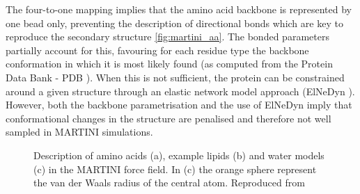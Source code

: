 The four-to-one mapping implies that the amino acid backbone is represented by one bead only, preventing the description of directional bonds which are key to reproduce the secondary structure \ref{fig:martini_aa}. The bonded parameters partially account for this, favouring for each residue type the backbone conformation in which it is most likely found (as computed from the Protein Data Bank - PDB \cite{PDB}). When this is not sufficient, the protein can be constrained around a given structure through an elastic network model approach (ElNeDyn \cite{Periole2009}). However, both the backbone parametrisation and the use of ElNeDyn imply that conformational changes in the structure are penalised and therefore not well sampled in MARTINI simulations.
%
\begin{figure}[h!]
\centering
{}
%
\caption[MARTINI force field mapping for amino acids, lipids and water description]{Description of amino acids (a), example lipids (b) and water models (c) in the MARTINI force field. In (c) the orange sphere represent the van der Waals radius of the central atom. Reproduced from \cite{Monticelli2008,calgary_site,Yesylevskyy2010}}
\label{fig:martini}
\end{figure}

